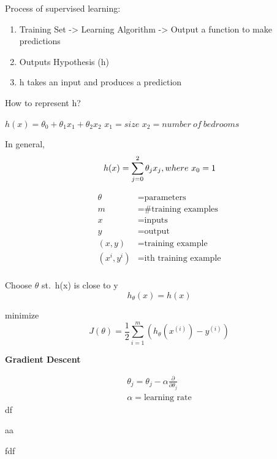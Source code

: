 \documentclass{article}
\newcommand{\vv}{\vspace{1em}}
\begin{document}
Process of supervised learning:
\begin{enumerate}
    \item Training Set -> Learning Algorithm -> Output a function to make predictions
    \item Outputs Hypothesis (h)
    \item h takes an input and produces a prediction
\end{enumerate}

\vspace{1em}

How to represent h?  

$h(x)=\theta_0 + \theta_1x_1 + \theta_2x_2$  
$x_1 = size$  
$x_2 = number \ of\  bedrooms$


In general,  
\[
    h(x) = \sum_{j=0}^2\theta_jx_j, \\  
where \ x_0 = 1
\]

\begin{align*}
    \theta &= \text{parameters} \\
    m &= \text{\# training examples} \\
    x &= \text{inputs} \\
    y &= \text{output} \\
    (x,y) &= \text{training example} \\
    (x^{i}, y^{i}) &= \text{ith training example} \\
\end{align*}

\vv


Choose $\theta$ st.\ h(x) is close to y
\[
    h_{\theta}(x) = h(x)
\]

minimize 
\[
    J(\theta) = \frac{1}{2}\sum^m_{i=1 }(h_{\theta}(x^{(i)}) - y^{(i)})
\]


\vv
\vv

\textbf{Gradient Descent}

\begin{align*}
    \theta_j = \theta_j - \alpha \frac{\partial}{\partial\theta_j} \\
    \alpha = \text{learning rate}
\end{align*}
df

aa

fdf
\end{document}
